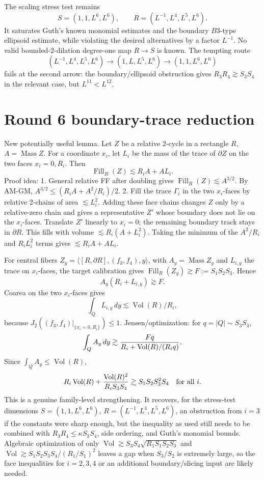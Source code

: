 \documentclass[12pt]{article}
\newcommand{\Vol}{\operatorname{Vol}}
\newcommand{\Fill}{\operatorname{Fill}}
\newcommand{\Mass}{\operatorname{Mass}}
\begin{document}
The scaling stress test remains
\[
S=(1,1,L^6,L^6),\qquad R=(L^{-1},L^4,L^5,L^6).
\]
It saturates Guth's known monomial estimates and the boundary \(B3\)-type
ellipsoid estimate, while violating the desired alternatives by a factor \(L^{-1}\).
No valid bounded-\(2\)-dilation degree-one map \(R\to S\) is known.  The tempting
route
\[
(L^{-1},L^4,L^5,L^6)\to(1,L,L^5,L^6)\to(1,1,L^6,L^6)
\]
fails at the second arrow: the boundary/ellipsoid obstruction gives
\(R_3R_4\gtrsim S_3S_4\) in the relevant case, but \(L^{11}<L^{12}\).



\section*{Round 6 boundary-trace reduction}

New potentially useful lemma.  Let \(Z\) be a relative \(2\)-cycle in a
rectangle \(R\), \(A=\Mass Z\).  For a coordinate \(x_i\), let \(L_i\) be the
mass of the trace of \(\partial Z\) on the two faces \(x_i=0,R_i\).  Then
\[
\Fill_R(Z)\lesssim R_iA+A L_i.
\]
Proof idea:
1. General relative FF after doubling gives \(\Fill_R(Z)\lesssim A^{3/2}\).
By AM-GM, \(A^{3/2}\le (R_iA+A^2/R_i)/2\).
2. Fill the trace \(\Gamma_i\) in the two \(x_i\)-faces by relative
2-chains of area \(\lesssim L_i^2\).  Adding these face chains changes \(Z\)
only by a relative-zero chain and gives a representative \(Z'\) whose boundary
does not lie on the \(x_i\)-faces.  Translate \(Z'\) linearly to \(x_i=0\);
the remaining boundary track stays in \(\partial R\).  This fills with volume
\(\lesssim R_i(A+L_i^2)\).
Taking the minimum of the \(A^2/R_i\) and \(R_iL_i^2\) terms gives
\(\lesssim R_iA+AL_i\).

For central fibers \(Z_y=\langle [R,\partial R],(f_3,f_4),y\rangle\), with
\(A_y=\Mass Z_y\) and \(L_{i,y}\) the trace on \(x_i\)-faces, the target
calibration gives \(\Fill_R(Z_y)\gtrsim F:=S_1S_2S_3\).  Hence
\[
A_y(R_i+L_{i,y})\gtrsim F.
\]
Coarea on the two \(x_i\)-faces gives
\[
\int_Q L_{i,y}\,dy\lesssim \Vol(R)/R_i,
\]
because \(J_2((f_3,f_4)|_{\{x_i=0,R_i\}})\le1\).  Jensen/optimization:
for \(q=|Q|\sim S_3S_4\),
\[
\int_Q A_y\,dy\gtrsim {Fq\over R_i+\Vol(R)/(R_iq)}.
\]
Since \(\int_Q A_y\le\Vol(R)\),
\[
R_i\Vol(R)+{\Vol(R)^2\over R_iS_3S_4}\gtrsim S_1S_2S_3^2S_4
\quad\text{for all }i.
\]
This is a genuine family-level strengthening.  It recovers, for the stress-test
dimensions \(S=(1,1,L^6,L^6)\), \(R=(L^{-1},L^4,L^5,L^6)\), an obstruction
from \(i=3\) if the constants were sharp enough, but the inequality as used
still needs to be combined with \(R_3R_4\le\kappa S_3S_4\), side ordering, and
Guth's monomial bounds.  Algebraic optimization of only
\(\Vol\gtrsim S_3S_4\sqrt{R_1S_1S_2S_3}\) and
\(\Vol\gtrsim S_1S_2S_3S_4/(R_1/S_1)^2\) leaves a gap when
\(S_3/S_2\) is extremely large, so the face inequalities for \(i=2,3,4\) or an
additional boundary/slicing input are likely needed.
\end{document}
